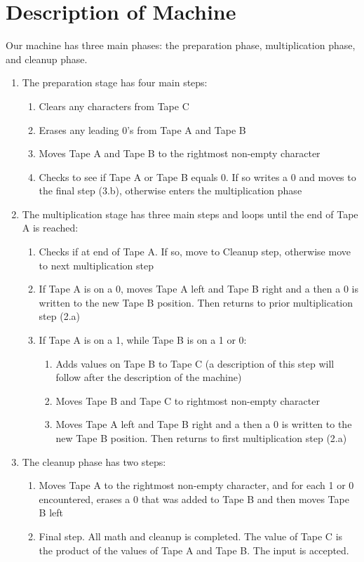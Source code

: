 \documentclass{article}
\begin{document}
\section*{Description of Machine}
Our machine has three main phases: the preparation phase, multiplication phase, and cleanup phase.
\\[5pt]
\begin{enumerate}
\item The preparation stage has four main steps:
	\begin{enumerate}
		\item Clears any characters from Tape C
		\item Erases any leading 0's from Tape A and Tape B
		\item Moves Tape A and Tape B to the rightmost non-empty character
		\item Checks to see if Tape A or Tape B equals 0. If so writes a 0 and moves to the final step (3.b), otherwise enters the multiplication phase
	\end{enumerate}
	\item The multiplication stage has three main steps and loops until the end of Tape A is reached:
	\begin{enumerate}
		\item Checks if at end of Tape A. If so, move to Cleanup step, otherwise move to next multiplication step
		\item If Tape A is on a 0, moves Tape A left and Tape B right and a then a 0 is written to the new Tape B position. Then returns to prior multiplication step (2.a)
		\item If Tape A is on a 1, while Tape B is on a 1 or 0:
		\begin{enumerate}
			\item Adds values on Tape B to Tape C (a description of this step will follow after the description of the machine)
			\item Moves Tape B and Tape C to rightmost non-empty character
			\item Moves Tape A left and Tape B right and a then a 0 is written to the new Tape B position. Then returns to first multiplication step (2.a)
		\end{enumerate}	
	\end{enumerate}
	\item The cleanup phase has two steps:
	\begin{enumerate}
		\item Moves Tape A to the rightmost non-empty character, and for each 1 or 0 encountered, erases a 0 that was added to Tape B and then moves Tape B left
		\item Final step. All math and cleanup is completed. The value of Tape C is the product of the values of Tape A and Tape B. The input is accepted.
	\end{enumerate}
\end{enumerate}
\end{document}
